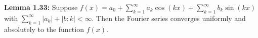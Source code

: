 {\bf Lemma 1.33:} Suppose $f(x)=a_0+\sum_{k=1}^{\infty}a_k\cos(kx)+\sum_{k=1}^{\infty}b_k\sin(kx)$ with $\sum_{k=1}^{\infty}|a_k|+|b:k|<\infty$. Then the Fourier series converges uniformly and absolutely to the function $f(x)$.